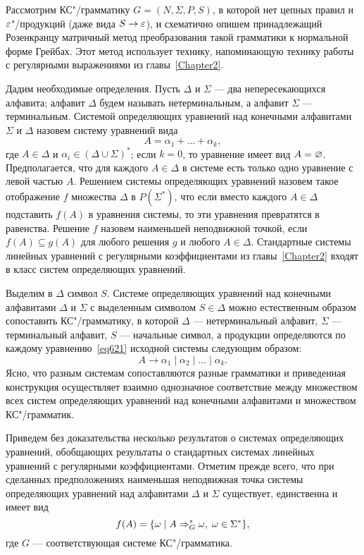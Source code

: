 Рассмотрим КС"/грамматику $G=(N,\Sigma,P,S)$, в которой нет цепных
правил и $\varepsilon$"/продукций (даже вида $S\to\varepsilon$), и схематично опишем
принадлежащий Розенкранцу матричный метод преобразования такой
грамматики к нормальной форме Грейбах. Этот метод использует технику,
напоминающую технику работы с регулярными выражениями из главы~\ref{Chapter2}.

Дадим необходимые определения. Пусть $\Delta$ и $\Sigma$ --- два
непересекающихся алфавита; алфавит $\Delta$ будем называть
нетерминальным, а алфавит $\Sigma$ --- терминальным. Системой
определяющих уравнений над конечными алфавитами $\Sigma$ и $\Delta$
назовем систему уравнений вида
\begin{equation}
\label{eq621}
A = \alpha_1 + \ldots + \alpha_k, %
\end{equation}
где $A\in\Delta$ и $\alpha_i\in(\Delta\cup\Sigma)^*$; если $k=0$, то
уравнение имеет вид $A=\varnothing$. Предполагается, что для каждого
$A\in\Delta$ в системе есть только одно уравнение с левой частью $A$.
Решением системы определяющих уравнений назовем такое отображение $f$
множества $\Delta$ в $P(\Sigma^*)$, что если вместо каждого
$A\in\Delta$ подставить $f(A)$ в уравнения системы, то эти уравнения
превратятся в равенства. Решение $f$ назовем наименьшей неподвижной
точкой, если $f(A)\subseteq g(A)$ для любого решения $g$ и любого
$A\in\Delta$. Стандартные системы линейных уравнений с регулярными
коэффициентами из главы~\ref{Chapter2} входят в класс систем определяющих уравнений.

Выделим в $\Delta$ символ $S$. Системе определяющих уравнений над
конечными алфавитами $\Delta$ и $\Sigma$ с выделенным символом
$S\in\Delta$ можно естественным образом сопоставить КС"/грамматику, в
которой $\Delta$ --- нетерминальный алфавит, $\Sigma$ --- терминальный
алфавит, $S$ --- начальные символ, а продукции определяются по каждому
уравнению~\eqref{eq621} исходной системы следующим образом:
\begin{equation}
\label{eq622}
    A \to  \alpha_1 \mid \alpha_2 \mid \ldots \mid \alpha_k.
\end{equation}
Ясно, что разным системам сопоставляются разные грамматики и
приведенная конструкция осуществляет взаимно однозначное соответствие
между множеством всех систем определяющих уравнений над конечными
алфавитами и множеством КС"/грамматик.

Приведем без доказательства несколько результатов о системах
определяющих уравнений, обобщающих результаты о стандартных системах
линейных уравнений с регулярными коэффициентами. Отметим прежде
всего, что при сделанных предположениях наименьшая неподвижная
точка системы определяющих уравнений над алфавитами $\Delta$
и $\Sigma$ существует, единственна и имеет вид
\[
    f(A) = \{\omega\mid A \Rightarrow_G^* \omega, \; \omega\in\Sigma^*\},
\]
где $G$ --- соответствующая системе КС"/грамматика.

